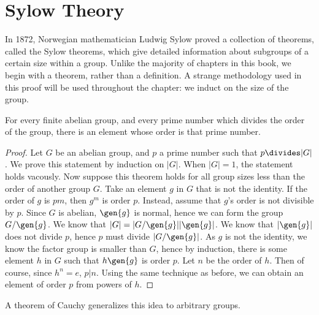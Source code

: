 \chapter{Sylow Theory}

In 1872, Norwegian mathematician Ludwig Sylow proved a collection of theorems, called the Sylow theorems, which give detailed information about subgroups of a certain size within a group. Unlike the majority of chapters in this book, we begin with a theorem, rather than a definition. A strange methodology used in this proof will be used throughout the chapter: we induct on the size of the group.

\begin{theorem}
    For every finite abelian group, and every prime number which divides the order of the group, there is an element whose order is that prime number.
\end{theorem}
\begin{proof}
    Let $G$ be an abelian group, and $p$ a prime number such that $p \divides |G|$. We prove this statement by induction on $|G|$. When $|G| = 1$, the statement holds vacously. Now suppose this theorem holds for all group sizes less than the order of another group $G$. Take an element $g$ in $G$ that is not the identity. If the order of $g$ is $pm$, then $g^m$ is order $p$. Instead, assume that $g$'s order is not divisible by $p$. Since $G$ is abelian, $\gen{g}$ is normal, hence we can form the group $G/\gen{g}$. We know that $|G| = |G/\gen{g}| |\gen{g}|$. We know that $|\gen{g}|$ does not divide $p$, hence $p$ must divide $|G/\gen{g}|$. As $g$ is not the identity, we know the factor group is smaller than $G$, hence by induction, there is some element $h$ in $G$ such that $h \gen{g}$ is order $p$. Let $n$ be the order of $h$. Then of course, since $h^n = e$, $p|n$. Using the same technique as before, we can obtain an element of order $p$ from powers of $h$.
\end{proof}

A theorem of Cauchy generalizes this idea to arbitrary groups.

